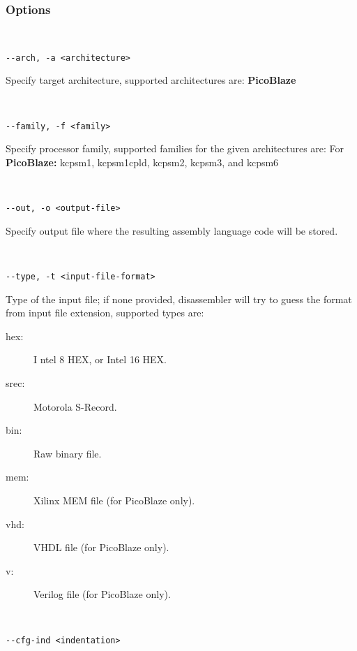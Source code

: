             \subsubsection{Options}
                {
                ~\\
                \usecodefont

                \verb'--arch, -a <architecture>'\\
                }
                Specify target architecture, supported architectures are: \textbf{PicoBlaze}
                {
                ~\\
                \usecodefont

                \verb'--family, -f <family>'\\
                }
                Specify processor family, supported families for the given architectures are:  For \textbf{PicoBlaze:} kcpsm1, kcpsm1cpld, kcpsm2, kcpsm3, and kcpsm6
                {
                ~\\
                \usecodefont

                \verb'--out, -o <output-file>'\\
                }
                Specify output file where the resulting assembly language code will be stored.
                {
                ~\\
                \usecodefont

                \verb'--type, -t <input-file-format>'\\
                }
                 Type of the input file; if none provided, disassembler will try to guess the format from input file extension, supported types are:
                 \begin{description}
                  \item [hex:]I ntel 8 HEX, or Intel 16 HEX.
                  \item [srec:] Motorola S-Record.
                  \item [bin:] Raw binary file.
                  \item [mem:] Xilinx MEM file (for PicoBlaze only).
                  \item [vhd:] VHDL file (for PicoBlaze only).
                  \item [v:] Verilog file (for PicoBlaze only).
                 \end{description}
                {
                ~\\
                \usecodefont

                \verb'--cfg-ind <indentation>'\\
                }
